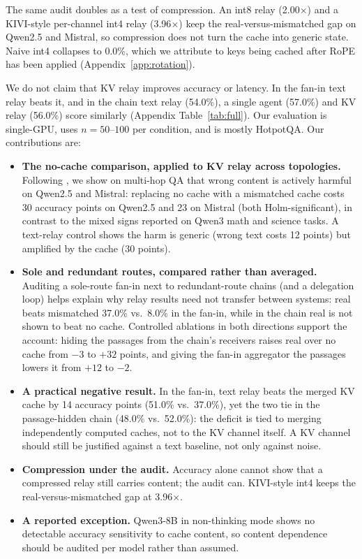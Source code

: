 \documentclass[11pt]{article}
\begin{document}
The same audit doubles as a test of compression. An int8 relay
(2.00$\times$) and a KIVI-style per-channel int4 relay \citep{kivi2024}
(3.96$\times$) keep the real-versus-mismatched gap on Qwen2.5 and Mistral, so
compression does not turn the cache into generic state. Naive int4 collapses to
0.0\%, which we attribute to keys being cached after RoPE has been applied
(Appendix~\ref{app:rotation}).

We do not claim that KV relay improves accuracy or latency. In the fan-in
text relay beats it, and in the chain text relay (54.0\%), a single agent (57.0\%)
and KV relay (56.0\%) score similarly (Appendix Table~\ref{tab:full}). Our
evaluation is single-GPU, uses $n{=}50$--$100$ per condition, and is mostly
HotpotQA. Our contributions are:

\begin{itemize}[leftmargin=*,itemsep=2pt,topsep=2pt]
\item \textbf{The no-cache comparison, applied to KV relay across topologies.}
Following \citet{zhangemu2026}, we show on multi-hop QA that wrong content is
actively harmful on Qwen2.5 and Mistral: replacing no cache with a mismatched
cache costs 30 accuracy points on Qwen2.5 and 23 on Mistral (both
Holm-significant), in contrast to the mixed signs reported on Qwen3 math and
science tasks. A text-relay control shows the harm is generic (wrong text costs 12
points) but amplified by the cache (30 points).
\item \textbf{Sole and redundant routes, compared rather than averaged.} Auditing
a sole-route fan-in next to redundant-route chains (and a delegation loop) helps
explain why relay results need not transfer between systems: real beats
mismatched 37.0\% vs.\ 8.0\% in the fan-in, while in the chain real is not shown
to beat no cache. Controlled ablations in both directions support the account:
hiding the passages from the chain's receivers raises real over no cache from $-3$
to $+32$ points, and giving the fan-in aggregator the passages lowers it from $+12$
to $-2$.
\item \textbf{A practical negative result.} In the fan-in, text relay beats the
merged KV cache by 14 accuracy points (51.0\% vs.\ 37.0\%), yet the two tie in the
passage-hidden chain (48.0\% vs.\ 52.0\%): the deficit is tied to merging
independently computed caches, not to the KV channel itself. A KV channel should
still be justified against a text baseline, not only against noise.
\item \textbf{Compression under the audit.} Accuracy alone cannot show that a
compressed relay still carries content; the audit can. KIVI-style int4 keeps the
real-versus-mismatched gap at 3.96$\times$.
\item \textbf{A reported exception.} Qwen3-8B in non-thinking mode shows no
detectable accuracy sensitivity to cache content, so content dependence should be
audited per model rather than assumed.
\end{itemize}
\end{document}
